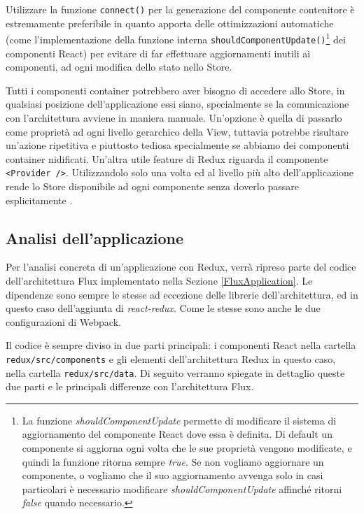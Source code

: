 Utilizzare la funzione \texttt{connect()} per la generazione del componente contenitore è estremamente preferibile in quanto apporta delle ottimizzazioni automatiche (come l'implementazione della funzione interna \texttt{shouldComponentUpdate()}\footnote{La funzione \textit{shouldComponentUpdate} permette di modificare il sistema di aggiornamento del componente React dove essa è definita. Di default un componente si aggiorna ogni volta che le sue proprietà vengono modificate, e quindi la funzione ritorna sempre \textit{true}. Se non vogliamo aggiornare un componente, o vogliamo che il suo aggiornamento avvenga solo in casi particolari è necessario modificare \textit{shouldComponentUpdate} affinché ritorni \textit{false} quando necessario.} dei componenti React) per evitare di far effettuare aggiornamenti inutili ai componenti, ad ogni modifica dello stato nello Store.

Tutti i componenti container potrebbero aver bisogno di accedere allo Store, in qualsiasi posizione dell'applicazione essi siano, specialmente se la comunicazione con l'architettura avviene in maniera manuale. Un'opzione è quella di passarlo come proprietà ad ogni livello gerarchico della View, tuttavia potrebbe risultare un'azione ripetitiva e piuttosto tediosa specialmente se abbiamo dei componenti container nidificati. Un'altra utile feature di Redux riguarda il componente \texttt{<Provider />}. Utilizzandolo solo una volta ed al livello più alto dell'applicazione rende lo Store disponibile ad ogni componente senza doverlo passare esplicitamente \cite{ReduxDocumentation}.

\subsection{Analisi dell'applicazione}
Per l'analisi concreta di un'applicazione con Redux, verrà ripreso parte del codice dell'architettura Flux implementato nella Sezione \ref{FluxApplication}. Le dipendenze sono sempre le stesse ad eccezione delle librerie dell'architettura, ed in questo caso dell'aggiunta di \textit{react-redux}. Come le stesse sono anche le due configurazioni di Webpack.

Il codice è sempre diviso in due parti principali: i componenti React nella cartella \texttt{redux/src/components} e gli elementi dell'architettura Redux in questo caso, nella cartella \texttt{redux/src/data}. Di seguito verranno spiegate in dettaglio queste due parti e le principali differenze con l'architettura Flux.

